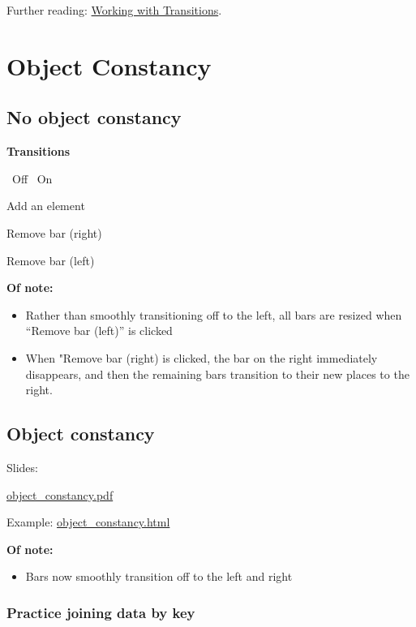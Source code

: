 \documentclass[
  openany]{book}
\providecommand{\tightlist}{%
  \setlength{\itemsep}{0pt}\setlength{\parskip}{0pt}}
\begin{document}
Further reading: \href{https://bost.ocks.org/mike/transition/}{Working with Transitions}.

\hypertarget{object}{%
\chapter{\texorpdfstring{Object Constancy }{Object Constancy }}\label{object}}

\hypertarget{no-object-constancy}{%
\section{No object constancy}\label{no-object-constancy}}

\hypertarget{chart}{}

\textbf{Transitions}

~Off
~On

Add an element

Remove bar (right)

Remove bar (left)

\textbf{Of note:}

\begin{itemize}
\item
  Rather than smoothly transitioning off to the left, all bars are resized when ``Remove bar (left)'' is clicked
\item
  When "Remove bar (right) is clicked, the bar on the right immediately disappears, and then the remaining bars transition to their new places to the right.
\end{itemize}

\hypertarget{object-constancy}{%
\section{Object constancy}\label{object-constancy}}

Slides:

\href{pdfs/object_constancy.pdf}{object\_constancy.pdf}

Example: \href{code/object_constancy.html}{object\_constancy.html}

\textbf{Of note:}

\begin{itemize}
\tightlist
\item
  Bars now smoothly transition off to the left and right
\end{itemize}

\hypertarget{practice-joining-data-by-key}{%
\subsection{Practice joining data by key}\label{practice-joining-data-by-key}}
\end{document}
